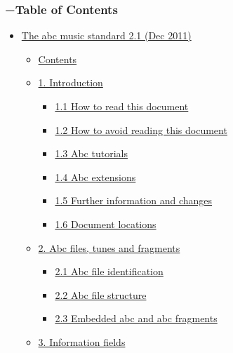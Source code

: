 \hypertarget{dw__toc}{}
\subsubsection{\texorpdfstring{\textbf{{−}}Table of
Contents}{−Table of Contents}}\label{table-of-contents}

\begin{itemize}
\item
  \protect\hyperlink{the_abc_music_standard_21_dec_2011}{The abc music
  standard 2.1 (Dec 2011)}

  \begin{itemize}
  \item
    \protect\hyperlink{contents}{Contents}
  \item
    \protect\hyperlink{introduction}{1. Introduction}

    \begin{itemize}
    \item
      \protect\hyperlink{how_to_read_this_document}{1.1 How to read this
      document}
    \item
      \protect\hyperlink{how_to_avoid_reading_this_document}{1.2 How to
      avoid reading this document}
    \item
      \protect\hyperlink{abc_tutorials}{1.3 Abc tutorials}
    \item
      \protect\hyperlink{abc_extensions}{1.4 Abc extensions}
    \item
      \protect\hyperlink{further_information_and_changes}{1.5 Further
      information and changes}
    \item
      \protect\hyperlink{document_locations}{1.6 Document locations}
    \end{itemize}
  \item
    \protect\hyperlink{abc_files_tunes_and_fragments}{2. Abc files,
    tunes and fragments}

    \begin{itemize}
    \item
      \protect\hyperlink{abc_file_identification}{2.1 Abc file
      identification}
    \item
      \protect\hyperlink{abc_file_structure}{2.2 Abc file structure}
    \item
      \protect\hyperlink{embedded_abc_and_abc_fragments}{2.3 Embedded
      abc and abc fragments}
    \end{itemize}
  \item
    \protect\hyperlink{information_fields}{3. Information fields}


\end{itemize}
\end{itemize}
